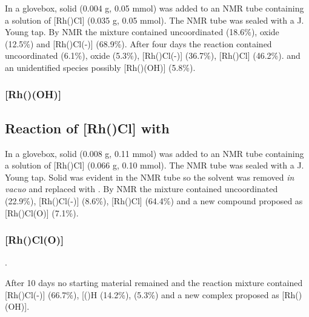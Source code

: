 
In a glovebox, solid  (0.004 g, 0.05 mmol) was added to an NMR tube containing a  solution of [Rh(\tBusixantphos)Cl] (0.035 g, 0.05 mmol).  The NMR tube was sealed with a J. Young tap.  By \phosphorus{} NMR the mixture contained uncoordinated \tBusixantphos{} (18.6\%), \tBusixantphos{} oxide (12.5\%) and [Rh(\tBusixantphos)Cl(-)] (68.9\%).  After four days the reaction contained uncoordinated \tBusixantphos{} (6.1\%), \tBusixantphos{} oxide (5.3\%), [Rh(\tBusixantphos)Cl(-)] (36.7\%),  [Rh(\tBusixantphos)Cl] (46.2\%). and an unidentified species possibly [Rh(\tBusixantphos)(OH)] (5.8\%).

\subsubsection{[Rh(\tBusixantphos)(OH)]}


\subsection*{Reaction of [Rh(\tButhixantphos)Cl] with \texorpdfstring{} O}

In a glovebox, solid  (0.008 g, 0.11 mmol) was added to an NMR tube containing a  solution of [Rh(\tButhixantphos)Cl] (0.066 g, 0.10 mmol).  The NMR tube was sealed with a J. Young tap.  Solid was evident in the NMR tube so the solvent was removed \emph{in vacuo} and replaced with .  By \phosphorus{} NMR the mixture contained uncoordinated \tButhixantphos{} (22.9\%), [Rh(\tButhixantphosk)Cl(-)] (8.6\%), [Rh(\tButhixantphosk)Cl] (64.4\%) and a new compound proposed as [Rh(\tButhixantphosk)Cl(O)] (7.1\%).

\subsubsection{[Rh(\tButhixantphosk)Cl(O)]}

.

After 10 days no starting material remained and the reaction mixture contained [Rh(\tButhixantphosk)Cl(-)] (66.7\%), [(\tButhixantphos)H\ce{]+} (14.2\%), \tButhixantphos{} (5.3\%) and a new complex proposed as [Rh(\tButhixantphos)\-(OH)].

